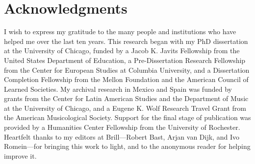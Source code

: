 \chapter{Acknowledgments}
\label{ch:thanks}

I wish to express my gratitude to the many people and institutions who have
helped me over the last ten years.
This research began with my PhD dissertation at the University of Chicago,
funded by a Jacob K. Javits Fellowship from the United States Department of
Education, a Pre-Dissertation Research Fellowship from the Center for European
Studies at Columbia University, and a Dissertation Completion Fellowship from
the Mellon Foundation and the American Council of Learned Societies.
My archival research in Mexico and Spain was funded by grants from the Center
for Latin American Studies and the Department of Music at the University of
Chicago, and a Eugene K. Wolf Research Travel Grant from the American
Musicological Society.
Support for the final stage of publication was provided by a Humanities Center
Fellowship from the University of Rochester.
Heartfelt thanks to my editors at Brill---Robert Bast, Arjan van Dijk, and Ivo
Romein---for bringing this work to light, and to the anonymous reader for
helping improve it.

